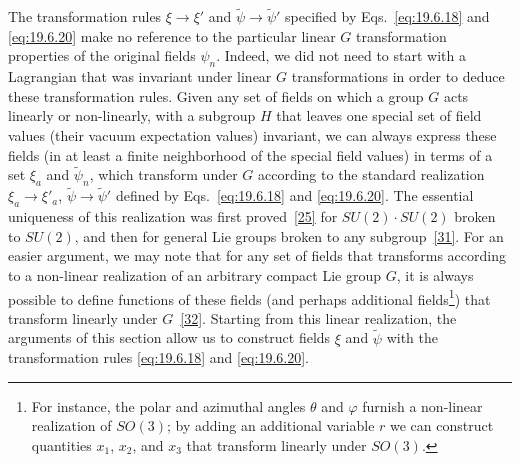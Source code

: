 The transformation rules $\xi\to\xi'$ and $\widetilde\psi\to\widetilde\psi'$ specified by Eqs.~\eqref{eq:19.6.18} and \eqref{eq:19.6.20} make no reference to the particular linear $G$ transformation properties of the original fields $\psi_n$. Indeed, we did not need to start with a Lagrangian that was invariant under linear $G$ transformations in order to deduce these transformation rules. Given any set of fields on which a group $G$ acts linearly or non-linearly, with a subgroup $H$ that leaves one special set of field values (their vacuum expectation values) invariant, we can always express these fields (in at least a finite neighborhood of the special field values) in terms of a set $\xi_a$ and $\widetilde\psi_n$, which transform under $G$ according to the standard realization $\xi_a\to\xi'_a$, $\widetilde\psi\to\widetilde\psi'$ defined by Eqs.~\eqref{eq:19.6.18} and \eqref{eq:19.6.20}. The essential uniqueness of this realization was first proved~\hyperref[ch19-ref-25]{[25]} for $SU(2)\cdot SU(2)$ broken to $SU(2)$, and then for general Lie groups broken to any subgroup~\hyperref[ch19-ref-31]{[31]}. For an easier argument, we may note that for any set of fields that transforms according to a non-linear realization of an arbitrary compact Lie group $G$, it is always possible to define functions of these fields (and perhaps additional fields\footnote{For instance, the polar and azimuthal angles $\theta$ and $\varphi$ furnish a non-linear realization of $SO(3)$; by adding an additional variable $r$ we can construct quantities $x_1$, $x_2$, and $x_3$ that transform linearly under $SO(3)$.}) that transform linearly under $G$~\hyperref[ch19-ref-32]{[32]}. Starting from this linear realization, the arguments of this section allow us to construct fields $\xi$ and $\widetilde\psi$ with the transformation rules \eqref{eq:19.6.18} and \eqref{eq:19.6.20}.

